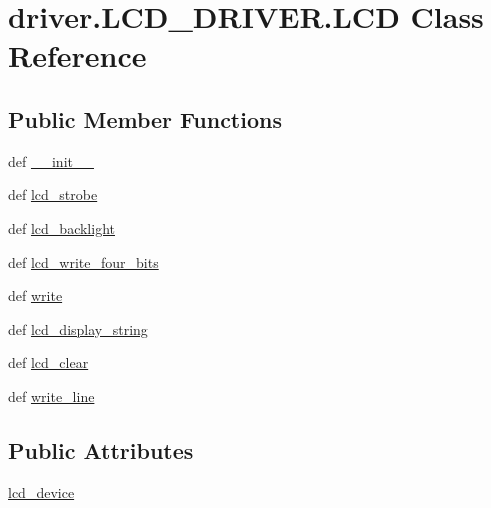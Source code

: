 \hypertarget{classdriver_1_1LCD__DRIVER_1_1LCD}{}\section{driver.\+L\+C\+D\+\_\+\+D\+R\+I\+V\+E\+R.\+L\+C\+D Class Reference}
\label{classdriver_1_1LCD__DRIVER_1_1LCD}
\subsection*{Public Member Functions}
\begin{DoxyCompactItemize}
\item 
def \hyperlink{classdriver_1_1LCD__DRIVER_1_1LCD_a20225b4d0a79ea608ab2788528735b17}{\+\_\+\+\_\+init\+\_\+\+\_\+}
\item 
def \hyperlink{classdriver_1_1LCD__DRIVER_1_1LCD_a15e214b2ce2f4e8e6e4eb46db360eb17}{lcd\+\_\+strobe}
\item 
def \hyperlink{classdriver_1_1LCD__DRIVER_1_1LCD_ac5e728a550c74f93db7aeac717f71f56}{lcd\+\_\+backlight}
\item 
def \hyperlink{classdriver_1_1LCD__DRIVER_1_1LCD_a50b4cd9441fc0869a3fc02823e1c4b50}{lcd\+\_\+write\+\_\+four\+\_\+bits}
\item 
def \hyperlink{classdriver_1_1LCD__DRIVER_1_1LCD_ad163c5a30bf46c9b7e794af4c5ee1580}{write}
\item 
def \hyperlink{classdriver_1_1LCD__DRIVER_1_1LCD_a234077a291a2a5fca1bac4e9cf6c05d0}{lcd\+\_\+display\+\_\+string}
\item 
def \hyperlink{classdriver_1_1LCD__DRIVER_1_1LCD_a6d9ced9d16566a567806e0bc2db053b4}{lcd\+\_\+clear}
\item 
def \hyperlink{classdriver_1_1LCD__DRIVER_1_1LCD_a4b8df3a45944a01d6a12b88f79d0d337}{write\+\_\+line}
\end{DoxyCompactItemize}
\subsection*{Public Attributes}
\begin{DoxyCompactItemize}
\item 
\hyperlink{classdriver_1_1LCD__DRIVER_1_1LCD_ac0009701948020eab39981e6db4f8b7e}{lcd\+\_\+device}
\end{DoxyCompactItemize}
